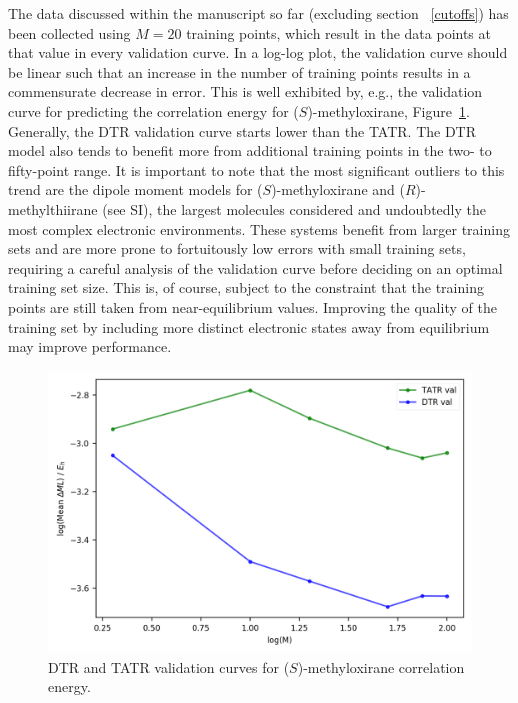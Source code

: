 The data discussed within the manuscript so far (excluding section ~\ref{cutoffs}) has been collected using $M = 20$ training points, which result in the data points at that value in every validation curve.
In a log-log plot, the validation curve should be linear such that an increase in the number of training points results in a commensurate decrease in error. 
This is well exhibited by, e.g., the validation curve for predicting the correlation energy for ($\textit{S}$)-methyloxirane, Figure~\ref{fig:metox_E_learn}. 
Generally, the DTR validation curve starts lower than the TATR. The DTR model also tends to benefit more from additional training points in the two- to fifty-point range. 
It is important to note that the most significant outliers to this trend are the dipole moment models for ($\textit{S}$)-methyloxirane and ($\textit{R}$)-methylthiirane (see SI), the largest molecules considered and undoubtedly the most complex electronic environments. These systems benefit from larger training sets and are more prone to fortuitously low errors with small training sets, requiring a careful analysis of the validation curve before deciding on an optimal training set size.
This is, of course, subject to the constraint that the training points are still taken from near-equilibrium values. Improving the quality of the training set by including more distinct electronic states away from equilibrium may improve performance.

\begin{figure}
    \centering
    \includegraphics[scale=.75]{p2/figures/metox_log_learn.png}
    \caption{DTR and TATR validation curves for ($\textit{S}$)-methyloxirane correlation energy.}
    \label{fig:metox_E_learn}
\end{figure}

